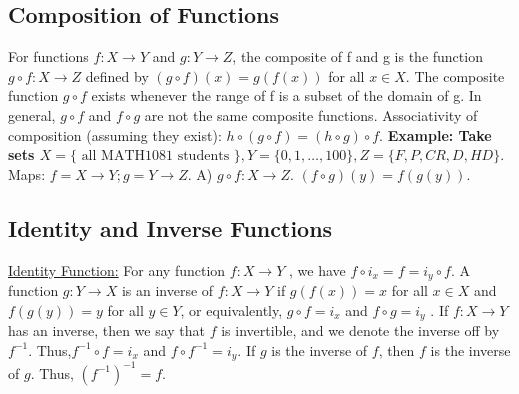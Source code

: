 \documentclass{article}
\begin{document}
  \subsection{Composition of Functions}
    For functions $f : X \rightarrow Y$ and $g : Y \rightarrow Z$, the composite of f and g is the function $g \circ f : X \rightarrow Z$ defined by $(g \circ f)(x) = g(f(x))$ for all $x \in X$.
    \newline
    \newline
    The composite function $g \circ f$ exists whenever the range of f is a subset of the domain of g.
    \newline
    \newline
    In general, $g \circ f$ and $f \circ g$ are not the same composite functions. Associativity of composition (assuming they exist): $h \circ (g \circ f) = (h \circ g) \circ f$.  
\newline
\newline
\textbf{ Example: Take sets $X = \{\text{ all MATH1081 students }\}, Y = \{ 0, 1, \dots, 100 \}, Z = \{F, P, CR, D, HD\}.$  }
\newline
\newline 
Maps: $f = X \rightarrow Y; g = Y \rightarrow Z.$
\newline
\newline
A) $g \circ f: X \rightarrow Z.$
\newline
$(f \circ g) (y) = f(g(y)).$
\newpage
\subsection{Identity and Inverse Functions}
\underline{ Identity Function:}
\newline
\newline
{}
\newline
\newline
For any function $f : X \rightarrow Y$ , we have $f \circ i_x = f = i_y \circ f$.   A function $g : Y \rightarrow X$ is an inverse of $f : X \rightarrow Y$ if
$g(f(x)) = x$ for all $x \in X$ and $f(g(y)) = y$ for all $y \in Y$,
\newline
or equivalently, $g \circ f = i_x$ and $f \circ g = i_y$ .
\newline
\newline
{}
\newline
\newline
If $f : X \rightarrow Y$ has an inverse, then we say that $f$ is invertible, and we denote the inverse off by $f^{-1}$. Thus,$f^{-1} \circ f = i_x$ and $f \circ f^{-1} = i_y$.
\newline
\newline
If $g$ is the inverse of $f$, then $f$ is the inverse of $g$. Thus, $(f^{-1})^{-1} = f$.
\newline
{}
\newpage
\end{document}
